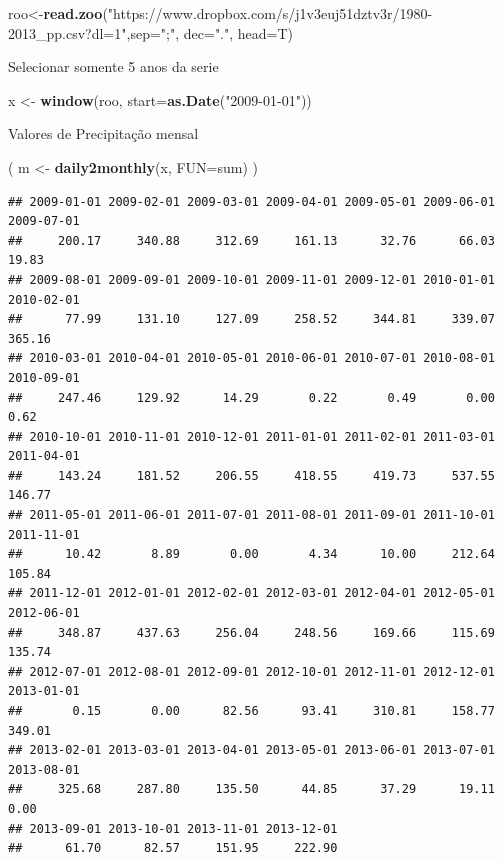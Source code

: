 \documentclass[
]{book}
\newenvironment{Shaded}{\begin{snugshade}}{\end{snugshade}}
\newcommand{\DataTypeTok}[1]{\textcolor[rgb]{0.13,0.29,0.53}{#1}}
\newcommand{\KeywordTok}[1]{\textcolor[rgb]{0.13,0.29,0.53}{\textbf{#1}}}
\newcommand{\NormalTok}[1]{#1}
\newcommand{\StringTok}[1]{\textcolor[rgb]{0.31,0.60,0.02}{#1}}
\begin{document}
\begin{Shaded}
\begin{Highlighting}[]
\NormalTok{roo<-}\KeywordTok{read.zoo}\NormalTok{(}\StringTok{"https://www.dropbox.com/s/j1v3euj51dztv3r/1980-2013_pp.csv?dl=1"}\NormalTok{,}\DataTypeTok{sep=}\StringTok{";"}\NormalTok{, }\DataTypeTok{dec=}\StringTok{"."}\NormalTok{, }\DataTypeTok{head=}\NormalTok{T)}
\end{Highlighting}
\end{Shaded}

Selecionar somente 5 anos da serie

\begin{Shaded}
\begin{Highlighting}[]
\NormalTok{x <-}\StringTok{ }\KeywordTok{window}\NormalTok{(roo, }\DataTypeTok{start=}\KeywordTok{as.Date}\NormalTok{(}\StringTok{"2009-01-01"}\NormalTok{))}
\end{Highlighting}
\end{Shaded}

Valores de Precipitação mensal

\begin{Shaded}
\begin{Highlighting}[]
\NormalTok{( m <-}\StringTok{ }\KeywordTok{daily2monthly}\NormalTok{(x, }\DataTypeTok{FUN=}\NormalTok{sum) )}
\end{Highlighting}
\end{Shaded}

\begin{verbatim}
## 2009-01-01 2009-02-01 2009-03-01 2009-04-01 2009-05-01 2009-06-01 2009-07-01 
##     200.17     340.88     312.69     161.13      32.76      66.03      19.83 
## 2009-08-01 2009-09-01 2009-10-01 2009-11-01 2009-12-01 2010-01-01 2010-02-01 
##      77.99     131.10     127.09     258.52     344.81     339.07     365.16 
## 2010-03-01 2010-04-01 2010-05-01 2010-06-01 2010-07-01 2010-08-01 2010-09-01 
##     247.46     129.92      14.29       0.22       0.49       0.00       0.62 
## 2010-10-01 2010-11-01 2010-12-01 2011-01-01 2011-02-01 2011-03-01 2011-04-01 
##     143.24     181.52     206.55     418.55     419.73     537.55     146.77 
## 2011-05-01 2011-06-01 2011-07-01 2011-08-01 2011-09-01 2011-10-01 2011-11-01 
##      10.42       8.89       0.00       4.34      10.00     212.64     105.84 
## 2011-12-01 2012-01-01 2012-02-01 2012-03-01 2012-04-01 2012-05-01 2012-06-01 
##     348.87     437.63     256.04     248.56     169.66     115.69     135.74 
## 2012-07-01 2012-08-01 2012-09-01 2012-10-01 2012-11-01 2012-12-01 2013-01-01 
##       0.15       0.00      82.56      93.41     310.81     158.77     349.01 
## 2013-02-01 2013-03-01 2013-04-01 2013-05-01 2013-06-01 2013-07-01 2013-08-01 
##     325.68     287.80     135.50      44.85      37.29      19.11       0.00 
## 2013-09-01 2013-10-01 2013-11-01 2013-12-01 
##      61.70      82.57     151.95     222.90
\end{verbatim}
\end{document}
